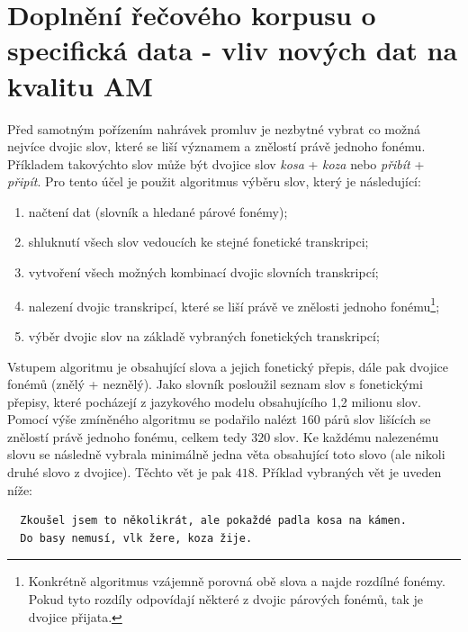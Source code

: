 \section{Doplnění řečového korpusu o specifická data - vliv nových dat na kvalitu AM}
\label{chap:realisation:corpus}

Před samotným pořízením nahrávek promluv je nezbytné vybrat co možná nejvíce dvojic slov, které se liší významem a znělostí právě jednoho fonému. Příkladem takovýchto slov může být dvojice slov \textit{kosa} + \textit{koza} nebo \textit{přibít} + \textit{připít}. Pro tento účel je použit algoritmus výběru slov, který je následující:

\begin{enumerate}
  \item načtení dat (slovník a hledané párové fonémy);
  \item shluknutí všech slov vedoucích ke stejné fonetické transkripci;
  \item vytvoření všech možných kombinací dvojic slovních transkripcí;
  \item nalezení dvojic transkripcí, které se liší právě ve znělosti jednoho fonému\footnote{Konkrétně algoritmus vzájemně porovná obě slova a najde rozdílné fonémy. Pokud tyto rozdíly odpovídají některé z dvojic párových fonémů, tak je dvojice přijata.};
  \item výběr dvojic slov na základě vybraných fonetických transkripcí;
\end{enumerate}

\noindent Vstupem algoritmu je  obsahující slova a jejich fonetický přepis, dále pak dvojice fonémů (znělý + neznělý). Jako slovník posloužil seznam slov s fonetickými přepisy, které pocházejí z jazykového modelu obsahujícího 1,2 milionu slov. Pomocí výše zmíněného algoritmu se podařilo nalézt $160$ párů slov lišících se znělostí právě jednoho fonému, celkem tedy $320$ slov. Ke každému nalezenému slovu se následně vybrala minimálně jedna věta obsahující toto slovo (ale nikoli druhé slovo z dvojice). Těchto vět je pak $418$. Příklad vybraných vět je uveden níže:

\begin{verbatim}
  Zkoušel jsem to několikrát, ale pokaždé padla kosa na kámen.
  Do basy nemusí, vlk žere, koza žije.
\end{verbatim}

